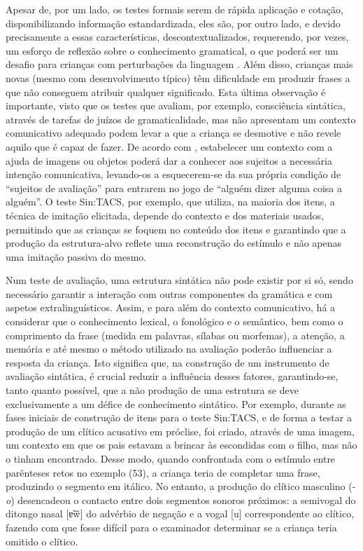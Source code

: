 \documentclass[output=paper,colorlinks,citecolor=brown,booklanguage=portuguese]{langscibook}
\begin{document}
Apesar de, por um lado, os testes formais serem de rápida aplicação e cotação, disponibilizando informação estandardizada, eles são, por outro lado, e devido precisamente a essas características, descontextualizados, requerendo, por vezes, um esforço de reflexão sobre o conhecimento gramatical, o que poderá ser um desafio para crianças com perturbações da linguagem \citep{Marinellie2006}. Além disso, crianças mais novas (mesmo com desenvolvimento típico) têm dificuldade em produzir frases a que não conseguem atribuir qualquer significado. Esta última observação é importante, visto que os testes que avaliam, por exemplo, consciência sintática, através de tarefas de juízos de gramaticalidade, mas não apresentam um contexto comunicativo adequado podem levar a que a criança se desmotive e não revele aquilo que é capaz de fazer. De acordo com \citet{Vinther2002}, estabelecer um contexto com a ajuda de imagens ou objetos poderá dar a conhecer aos sujeitos a necessária intenção comunicativa, levando-os a esquecerem-se da sua própria condição de “sujeitos de avaliação” para entrarem no jogo de “alguém dizer alguma coisa a alguém”. O teste Sin:TACS, por exemplo, que utiliza, na maioria dos itens, a técnica de imitação elicitada, depende do contexto e dos materiais usados, permitindo que as crianças se foquem no conteúdo dos itens e garantindo que a produção da estrutura-alvo reflete uma reconstrução do estímulo e não apenas uma imitação passiva do mesmo. 

Num teste de avaliação, uma estrutura sintática não pode existir por si só, sendo necessário garantir a interação com outras componentes da gramática e com aspetos extralinguísticos. Assim, e para além do contexto comunicativo, há a considerar que o conhecimento lexical, o fonológico e o semântico, bem como o comprimento da frase (medida em palavras, sílabas ou morfemas), a atenção, a memória e até mesmo o método utilizado na avaliação poderão influenciar a resposta da criança. Isto significa que, na construção de um instrumento de avaliação sintática, é crucial reduzir a influência desses fatores, garantindo-se, tanto quanto possível, que a não produção de uma estrutura se deve exclusivamente a um défice de conhecimento sintático. Por exemplo, durante as fases iniciais de construção de itens para o teste Sin:TACS, e de forma a testar a produção de um clítico acusativo em próclise, foi criado, através de uma imagem, um contexto em que os pais estavam a brincar às escondidas com o filho, mas não o tinham encontrado. Desse modo, quando confrontada com o estímulo entre parênteses retos no exemplo (53), a criança teria de completar uma frase, produzindo o segmento em itálico. No entanto, a produção do clítico masculino (-\emph{o}) desencadeou o contacto entre dois segmentos sonoros próximos: a semivogal do ditongo nasal [ɐ̃w̃] do advérbio de negação e a vogal [u] correspondente ao clítico, fazendo com que fosse difícil para o examinador determinar se a criança teria omitido o clítico.
\end{document}
